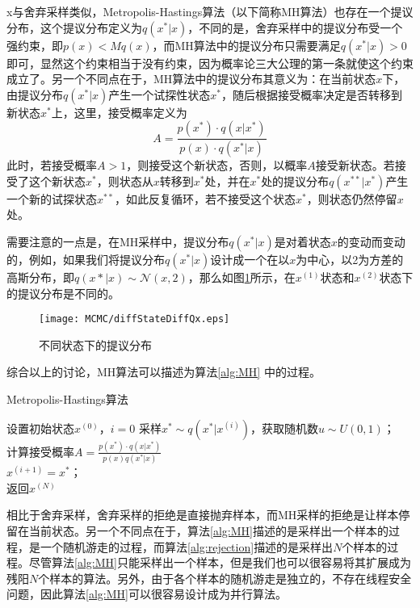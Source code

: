 x与舍弃采样类似，Metropolis-Hastings算法（以下简称MH算法）也存在一个提议分布，这个提议分布定义为$q(x^*|x)$，不同的是，舍弃采样中的提议分布受一个强约束，即$p(x) < Mq(x)$，而MH算法中的提议分布只需要满足$q(x^*|x)>0$即可，显然这个约束相当于没有约束，因为概率论三大公理的第一条就使这个约束成立了。另一个不同点在于，MH算法中的提议分布其意义为：在当前状态$x$下，由提议分布$q(x^*|x)$产生一个试探性状态$x^*$，随后根据接受概率决定是否转移到新状态$x^*$上，这里，接受概率定义为
\begin{equation}\label{equ:MHaccept}
A = \frac{p(x^*)\cdot q(x|x^*)}{p(x)\cdot q(x^*|x)}
\end{equation}
此时，若接受概率$A > 1$，则接受这个新状态，否则，以概率$A$接受新状态。若接受了这个新状态$x^*$，则状态从$x$转移到$x^*$处，并在$x^*$处的提议分布$q(x^{**}|x^*)$产生一个新的试探状态$x^{**}$，如此反复循环，若不接受这个状态$x^*$，则状态仍然停留$x$处。

需要注意的一点是，在MH采样中，提议分布$q(x^*|x)$是对着状态$x$的变动而变动的，例如，如果我们将提议分布$q(x^*|x)$设计成一个在以$x$为中心，以2为方差的高斯分布，即$q(x*|x)\sim \mathcal{N}(x, 2)$，那么如图\ref{img:diffStateDiffQx}所示，在$x^{(1)}$状态和$x^{(2)}$状态下的提议分布是不同的。

\begin{figure}[htbp]
\centering
\texttt{[image: MCMC/diffStateDiffQx.eps]}
\caption{不同状态下的提议分布}\label{img:diffStateDiffQx}
\end{figure}


综合以上的讨论，MH算法可以描述为算法\ref{alg:MH} 中的过程。

\vspace{1em}
\begin{minipage}{0.8\textwidth}\centering
\begin{algorithm}[H]\label{alg:MH}
 \caption{Metropolis-Hastings算法}
设置初始状态$x^{(0)}$，$i=0$\;
{
采样$x^*\sim q(x^*|x^{(i)})$，获取随机数$u\sim U(0,1)$；\\
计算接受概率$A = \frac{p(x^*)\cdot q(x|x^*)}{p(x)q(x^*|x)}$\\
{
$x^{(i+1)} = x^*$；\\
}
}
返回$x^{(N)}$
\end{algorithm}
\end{minipage}
\vspace{1em}

相比于舍弃采样，舍弃采样的拒绝是直接抛弃样本，而MH采样的拒绝是让样本停留在当前状态。另一个不同点在于，算法\ref{alg:MH}描述的是采样出一个样本的过程，是一个随机游走的过程，而算法\ref{alg:rejection}描述的是采样出$N$个样本的过程。尽管算法\ref{alg:MH}只能采样出一个样本，但是我们也可以很容易将其扩展成为残阳$N$个样本的算法。另外，由于各个样本的随机游走是独立的，不存在线程安全问题，因此算法\ref{alg:MH}可以很容易设计成为并行算法。

